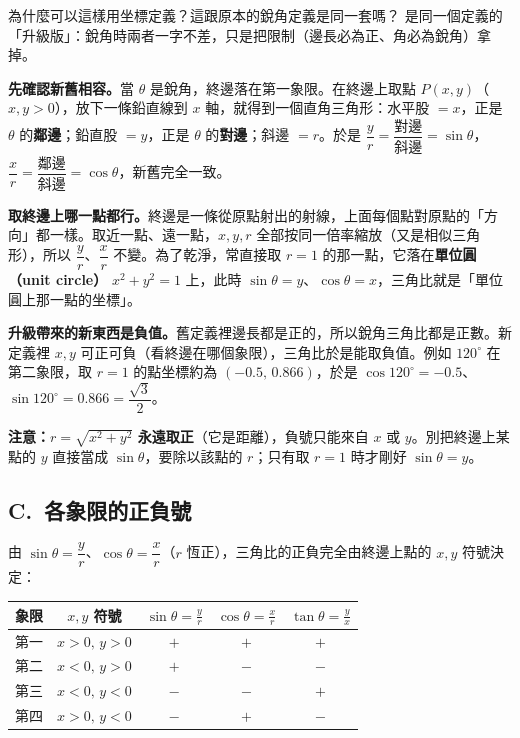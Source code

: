 \documentclass[11pt]{article}
\begin{document}
\begin{補充框}{為什麼可以這樣用坐標定義？這跟原本的銳角定義是同一套嗎？}
是同一個定義的「升級版」：銳角時兩者一字不差，只是把限制（邊長必為正、角必為銳角）拿掉。

\textbf{先確認新舊相容。}當 $\theta$ 是銳角，終邊落在第一象限。在終邊上取點 $P(x,y)$（$x,y>0$），放下一條鉛直線到 $x$ 軸，就得到一個直角三角形：水平股 $=x$，正是 $\theta$ 的\textbf{鄰邊}；鉛直股 $=y$，正是 $\theta$ 的\textbf{對邊}；斜邊 $=r$。於是 $\dfrac{y}{r}=\dfrac{\text{對邊}}{\text{斜邊}}=\sin\theta$，$\dfrac{x}{r}=\dfrac{\text{鄰邊}}{\text{斜邊}}=\cos\theta$，新舊完全一致。

\textbf{取終邊上哪一點都行。}終邊是一條從原點射出的射線，上面每個點對原點的「方向」都一樣。取近一點、遠一點，$x,y,r$ 全部按同一倍率縮放（又是相似三角形），所以 $\dfrac{y}{r}$、$\dfrac{x}{r}$ 不變。為了乾淨，常直接取 $r=1$ 的那一點，它落在\textbf{單位圓（unit circle）} $x^2+y^2=1$ 上，此時 $\sin\theta=y$、$\cos\theta=x$，三角比就是「單位圓上那一點的坐標」。

\textbf{升級帶來的新東西是負值。}舊定義裡邊長都是正的，所以銳角三角比都是正數。新定義裡 $x,y$ 可正可負（看終邊在哪個象限），三角比於是能取負值。例如 $120^\circ$ 在第二象限，取 $r=1$ 的點坐標約為 $(-0.5,\,0.866)$，於是 $\cos120^\circ=-0.5$、$\sin120^\circ=0.866=\dfrac{\sqrt3}{2}$。

\textbf{注意：}$r=\sqrt{x^2+y^2}$ \textbf{永遠取正}（它是距離），負號只能來自 $x$ 或 $y$。別把終邊上某點的 $y$ 直接當成 $\sin\theta$，要除以該點的 $r$；只有取 $r=1$ 時才剛好 $\sin\theta=y$。
\end{補充框}

\subsection*{\sffamily C.\ 各象限的正負號}

由 $\sin\theta=\dfrac{y}{r}$、$\cos\theta=\dfrac{x}{r}$（$r$ 恆正），三角比的正負完全由終邊上點的 $x,y$ 符號決定：

\begin{center}
\renewcommand{\arraystretch}{1.4}
\begin{tabular}{c|c|c|c|c}
\hline
象限 & $x,y$ 符號 & $\sin\theta=\frac{y}{r}$ & $\cos\theta=\frac{x}{r}$ & $\tan\theta=\frac{y}{x}$ \\
\hline
第一 & $x>0,\,y>0$ & $+$ & $+$ & $+$ \\
第二 & $x<0,\,y>0$ & $+$ & $-$ & $-$ \\
第三 & $x<0,\,y<0$ & $-$ & $-$ & $+$ \\
第四 & $x>0,\,y<0$ & $-$ & $+$ & $-$ \\
\hline
\end{tabular}
\end{center}
\end{document}
